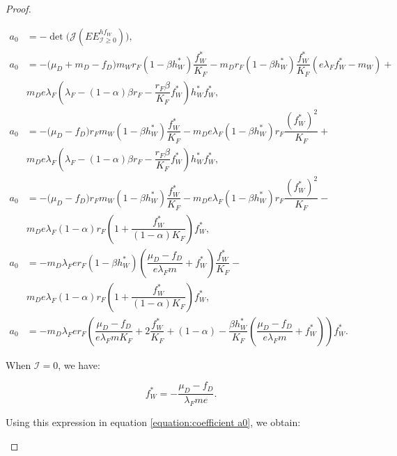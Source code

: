 \documentclass{article}
\newcommand{\lfw}{\lambda_{F}}
\newcommand{\lfw}{\lambda_{F}}
\newcommand{\cI}{\mathcal{I}}
\theoremstyle{definition}
\theoremstyle{remark}
\begin{document}
\begin{proof}
\begin{itemize}
\begin{subequations}
\begin{align}
a_0 &= -\det\Big(\mathcal{J}(EE^{hf_W}_{\cI \geq 0})\Big), \\
a_0 &= -\Big(\mu_D + m_D -f_D \Big) m_W r_F (1 - \beta h_W^*) \dfrac{f^*_W}{K_F}  - m_D r_F (1 - \beta h_W^*) \dfrac{f_W^*}{K_F}(e\lfw f_W^* - m_W) + \\
\nonumber
&  m_D e \lfw  \left(\lfw - (1-\alpha)\beta r_F  - \dfrac{r_F\beta}{K_F} f_W^* \right)h_W^* f_W^*, \\
a_0 &= -\Big(\mu_D -f_D \Big) r_F m_W (1 - \beta h_W^*) \dfrac{f^*_W}{K_F}  - m_D e\lfw (1 - \beta h_W^*) r_F \dfrac{(f_W^*)^2}{K_F} + \\
\nonumber
&  m_D e \lfw \left(\lfw - (1-\alpha)\beta r_F  - \dfrac{r_F\beta}{K_F} f_W^* \right)h_W^*f_W^*, \\
a_0 &= -\Big(\mu_D -f_D \Big) r_F m_W (1 - \beta h_W^*) \dfrac{f^*_W}{K_F}  - m_D e\lfw (1 - \beta h_W^*) r_F \dfrac{(f_W^*)^2}{K_F} - \\
\nonumber
&  m_D e \lfw (1- \alpha) r_F \left(1 + \dfrac{f_W^*}{(1- \alpha)K_F}\right) f_W^*, \\
a_0 &= -m_D \lfw e r_F (1 - \beta h_W^*) \left(\dfrac{\mu_D -f_D }{e \lfw m} + f_W^*\right) \dfrac{f_W^*}{K_F} - \\
\nonumber
& m_D e \lfw (1- \alpha) r_F \left(1 + \dfrac{f_W^*}{(1- \alpha)K_F}\right) f_W^*,  \\
a_0 &= -m_D \lfw e r_F \left(\dfrac{\mu_D -f_D }{e \lfw m K_F} + 2\dfrac{f_W^*}{K_F} + (1-\alpha) - \dfrac{\beta h_W^*}{K_F} \left(\dfrac{\mu_D -f_D }{e \lfw m} + f_W^*\right) \right) f_W^*.   \label{equation:coefficient a0}
\end{align}
\end{subequations}

When $\cI = 0$, we have:

\begin{equation*}
f_W^* = - \dfrac{\mu_D - f_D}{\lfw m e}.
\end{equation*} 

Using this expression in equation \eqref{equation:coefficient a0}, we obtain:


\end{itemize}
\end{proof}
\end{document}
